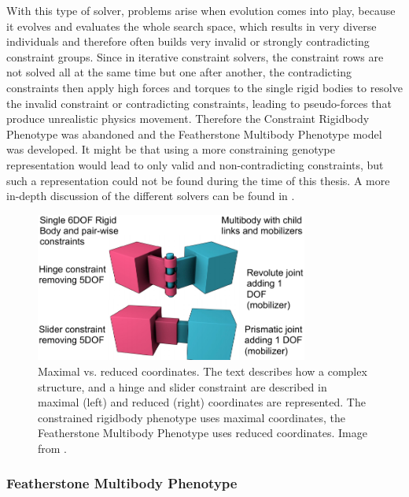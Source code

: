 \documentclass[main]{subfiles}
\begin{document}
%
With this type of solver, problems arise when evolution comes into play, because it evolves and evaluates the whole search space, which results in very diverse individuals and therefore often builds very invalid or strongly contradicting constraint groups. %
%
Since in iterative constraint solvers, the constraint rows are not solved all at the same time but one after another, the contradicting constraints then apply high forces and torques to the single rigid bodies to resolve the invalid constraint or contradicting constraints, leading to pseudo-forces that produce unrealistic physics movement. %
%
Therefore the Constraint Rigidbody Phenotype was abandoned and the Featherstone Multibody Phenotype model was developed. %
%
It might be that using a more constraining genotype representation would lead to only valid and non-contradicting constraints, but such a representation could not be found during the time of this thesis. %
%
A more in-depth discussion of the different solvers can be found in \cite{bib::Coumans2014}.

\begin{figure}[H]
\centering
\includegraphics[width=0.8\textwidth]{Pictures/evolutionary-optimization/maximal-vs-reduced-coordinates.pdf}

\caption[Maximal vs. reduced coordinates]{Maximal vs. reduced coordinates. The text describes how a complex structure, and a hinge and slider constraint are described in maximal (left) and reduced (right) coordinates are represented. The constrained rigidbody phenotype uses maximal coordinates, the Featherstone Multibody Phenotype uses reduced coordinates. Image from \cite{bib::Coumans2014}.}
\label{figure:maximal-vs-reduced}
\end{figure}

\subsubsection{Featherstone Multibody Phenotype}
\end{document}
